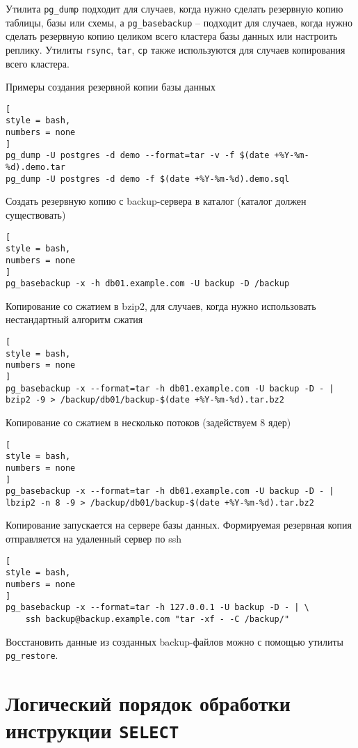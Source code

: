 \documentclass[%
	11pt,
	a4paper,
	utf8,
		]{article}
\begin{document}
Утилита \texttt{pg\_dump} подходит для случаев, когда нужно сделать резервную копию таблицы, базы или схемы, а \texttt{pg\_basebackup} -- подходит для случаев, когда нужно сделать резервную копию целиком всего кластера базы данных или настроить реплику. Утилиты \texttt{rsync}, \texttt{tar}, \texttt{cp} также используются для случаев копирования всего кластера.

Примеры создания резервной копии базы данных
\begin{lstlisting}[
style = bash,
numbers = none
]
pg_dump -U postgres -d demo --format=tar -v -f $(date +%Y-%m-%d).demo.tar
pg_dump -U postgres -d demo -f $(date +%Y-%m-%d).demo.sql
\end{lstlisting}

Создать резервную копию с backup-сервера в каталог  (каталог должен существовать)
\begin{lstlisting}[
style = bash,
numbers = none
]
pg_basebackup -x -h db01.example.com -U backup -D /backup

\end{lstlisting}

Копирование со сжатием в bzip2, для случаев, когда нужно использовать нестандартный алгоритм сжатия
\begin{lstlisting}[
style = bash,
numbers = none
]
pg_basebackup -x --format=tar -h db01.example.com -U backup -D - | bzip2 -9 > /backup/db01/backup-$(date +%Y-%m-%d).tar.bz2
\end{lstlisting}

Копирование со сжатием в несколько потоков (задействуем 8 ядер)
\begin{lstlisting}[
style = bash,
numbers = none
]
pg_basebackup -x --format=tar -h db01.example.com -U backup -D - | lbzip2 -n 8 -9 > /backup/db01/backup-$(date +%Y-%m-%d).tar.bz2
\end{lstlisting}

Копирование запускается на сервере базы данных. Формируемая резервная копия отправляется на удаленный сервер по ssh
\begin{lstlisting}[
style = bash,
numbers = none
]
pg_basebackup -x --format=tar -h 127.0.0.1 -U backup -D - | \
    ssh backup@backup.example.com "tar -xf - -C /backup/"
\end{lstlisting}

Восстановить данные из созданных backup-файлов можно с помощью утилиты \texttt{pg\_restore}.




\section{Логический порядок обработки инструкции \texttt{SELECT}}
\end{document}
